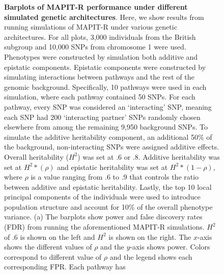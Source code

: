 \documentclass[10pt]{article}
\begin{document}
\begin{figure}[htbp]
\caption{\textbf{Barplots of MAPIT-R performance under different simulated genetic architectures}. Here, we show results from running simulations of MAPIT-R under various genetic architectures. For all plots, 3,000 individuals from the British subgroup and 10,000 SNPs from chromosome 1 were used. Phenotypes were constructed by simulation both additive and epistatic components. Epistatic components were constructed by simulating interactions between pathways and the rest of the genomic background. Specifically, 10 pathways were used in each simulation, where each pathway contained 50 SNPs. For each pathway, every SNP was considered an `interacting' SNP, meaning each SNP had 200 `interacting partner' SNPs randomly chosen elsewhere from among the remaining 9,950 background SNPs. To simulate the additive heritability component, an additional 50\% of the background, non-interacting SNPs were assigned additive effects. Overall heritability ($H^2$) was set at .6 or .8. Additive heritability was set at $H^2*(\rho)$ and epistatic heritability was set at $H^2*(1-\rho)$, where $\rho$ is a value ranging from .6 to .9 that controls the ratio between additive and epistatic heritability. Lastly, the top 10 local principal components of the individuals were used to introduce population structure and account for 10\% of the overall phenotype variance. (a) The barplots show power and false discovery rates (FDR) from running the aforementioned MAPIT-R simulations. $H^2$ of .6 is shown on the left and $H^2$ is shown on the right. The $x$-axis shows the different values of $\rho$ and the $y$-axis shows power. Colors correspond to different value of $\rho$ and the legend shows each corresponding FPR.
Each pathway has
}
\end{figure}
\end{document}

